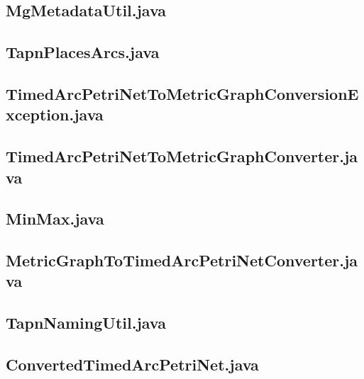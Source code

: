 \documentclass{../TechDoc}
\begin{document}
	\subsection{MgMetadataUtil.java}
	
	\subsection{TapnPlacesArcs.java}
	
	\subsection{TimedArcPetriNetToMetricGraphConversionException.java}
	
	\subsection{TimedArcPetriNetToMetricGraphConverter.java}
	
	\subsection{MinMax.java}
	
	\subsection{MetricGraphToTimedArcPetriNetConverter.java}
	
	\subsection{TapnNamingUtil.java}
	
	\subsection{ConvertedTimedArcPetriNet.java}
	
\end{document}
